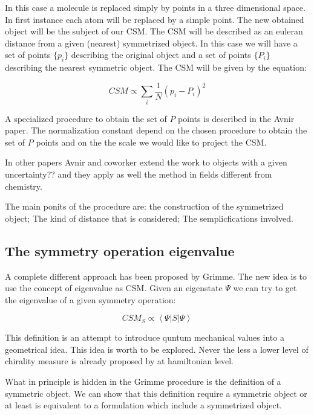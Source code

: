 \documentclass[a4paper,12pt]{article}
\newcommand\brint[3]{{\left\langle #1\vert #2 \vert #3\right\rangle}}
\begin{document}
In this case a molecule is replaced simply by points in a three dimensional
space. In first instance each atom will be replaced by a simple point.
The new obtained object will be the subject of our CSM. The CSM will
be described as an euleran distance from a given (nearest) symmetrized
object. In this case we will have a set of points $\{ p_i \}$ describing
the original object and a set of points $\{ P_i \}$ describing the nearest
symmetric object. The CSM will be given by the equation:

\begin{equation}
CSM \propto \sum_i \frac1N \left( p_i - P_i \right)^2
\end{equation}

A specialized procedure to obtain the set of $P$ points is
described in the Avnir paper\cite{AvnirPoints}. The normalization constant
depend on the chosen procedure to obtain the set of $P$ points
and on the the scale we would like to project the CSM.

In other papers Avnir and coworker extend the work to objects
with a given uncertainty??\cite{AvnirDist} and they apply as well
the method in fields different from chemistry\cite{AvnirGraphic}.

The main ponits of the procedure are: the construction of the symmetrized object; The kind of distance that is considered; The semplicfications involved.

\subsection{The symmetry operation eigenvalue}

A complete different approach has been proposed by Grimme\cite{GrimmeCSM}.
The new idea is to use the concept of eigenvalue as CSM.
Given an eigenstate $\Psi$ we can try to get the eigenvalue of
a given symmetry operation:

\begin{equation}
CSM_S \propto \brint{\Psi}{S}{\Psi}
\end{equation}

This definition is an attempt to introduce quntum mechanical values into
a geometrical idea. This idea is worth to be explored. Never the less
a lower level of chirality measure is already proposed by \cite{quack:chir1}
at hamiltonian level.

What in principle is hidden in the Grimme procedure is the definition of
a symmetric object. We can show that this definition require a symmetric
object or at least is equivalent to a formulation which include a symmetrized
object.
\end{document}
